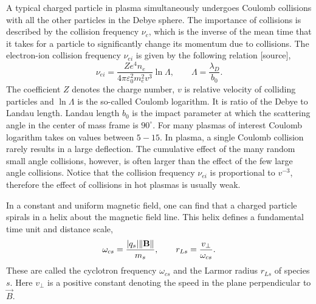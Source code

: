 A typical charged particle in plasma simultaneously undergoes Coulomb collisions with all the other particles in the Debye sphere. The importance of collisions is described by the collision frequency $ \nu_c $, which is the inverse of the mean time that it takes for a particle to significantly change its momentum due to collisions. The electron-ion collision frequency $ \nu_{ei} $ is given by the following relation [source],
\begin{equation}
\label{2.1.6}
\nu_{ei} = \frac{Z e^4 n_e}{4 \pi \varepsilon_0^2 m_e^2 v^3} \ln{\Lambda}, \qquad \Lambda = \frac{\lambda_D}{b_0}.
\end{equation}
The coefficient $ Z $ denotes the charge number, $ v $ is relative velocity of colliding particles and $ \ln \Lambda $ is the so-called Coulomb logarithm. It is ratio of the Debye to Landau length. Landau length $ b_0 $ is the impact parameter at which the scattering angle in the center of mass frame is $ 90^\circ $. For many plasmas of interest Coulomb logarithm takes on values between $ 5 - 15 $. In plasma, a single Coulomb collision rarely results in a large deflection. The cumulative effect of the many random small angle collisions, however, is often larger than the effect of the few large angle collisions. Notice that the collision frequency $ \nu_{ei} $ is proportional to $ v^{-3} $, therefore the effect of collisions in hot plasmas is usually weak.

In a constant and uniform magnetic field, one can find that a charged particle spirals in a helix about the magnetic field line. This helix defines a fundamental time unit and distance scale,
\begin{equation}
\label{2.1.7}
\omega_{cs} = \frac{\lvert q_{s}\rvert \lVert\mathbf{B}\rVert}{m_{s}}, \qquad r_{Ls} = \frac{v_\perp}{\omega_{cs}}.
\end{equation}
These are called the cyclotron frequency $ \omega_{cs} $ and the Larmor radius $ r_{Ls} $ of species $ s $. Here $ v_\perp $ is a positive constant denoting the speed in the plane perpendicular to $ \vec{B} $.
